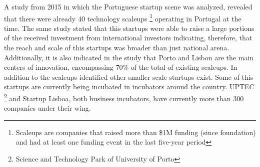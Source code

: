        A study from 2015 \citet{StartupEuropePartnership2015} in which the Portuguese startup scene was analyzed, revealed that there were already 40 technology scaleups \footnote{Scaleups are companies that raised more than \$1M funding (since foundation) and had at least one funding event in the last five-year period } operating in Portugal at the time. The same study stated that this startups were able to raise a large portions of the received investment from international investors indicating, therefore, that the reach and scale of this startups was broader than just national arena. Additionally, it is also indicated in the study that Porto and Lisbon are the main centers of innovation, encompassing 70\% of the total of existing scaleups. In addition to the scaleups identified other smaller scale startups exist. Some of this startups are currently being incubated in incubators around the country. UPTEC \footnote{Science and Technology Park of University of Porto} and Startup Lisboa, both business incubators, have currently more than 300 companies \cite{Uptec,StartupLisboa} under their wing. 
